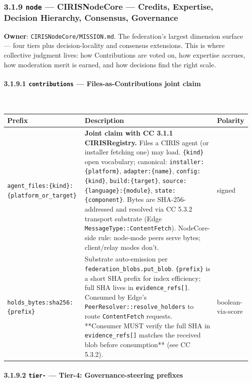 \documentclass[11pt]{article}
\begin{document}
\subsubsection*{3.1.9 \texttt{node} — CIRISNodeCore — Credits, Expertise, Decision Hierarchy, Consensus, Governance}


\textbf{Owner}: \texttt{CIRISNodeCore/MISSION.md}. The federation's largest dimension surface — four tiers plus decision-locality and consensus extensions. This is where collective judgment lives: how Contributions are voted on, how expertise accrues, how moderation merit is earned, and how decisions find the right scale.


\paragraph{3.1.9.1 \texttt{contributions} — Files-as-Contributions joint claim}\mbox{}\\


{\footnotesize
\begin{longtable}{|p{5.33cm}|p{5.33cm}|p{5.33cm}|}\hline
\textbf{Prefix} & \textbf{Description} & \textbf{Polarity} \\ \hline\endhead
\texttt{agent\_files:\{kind\}:\{platform\_or\_target\}} & \textbf{Joint claim with CC 3.1.1 CIRISRegistry.} Files a CIRIS agent (or installer fetching one) may load. \texttt{\{kind\}} open vocabulary; canonical: \texttt{installer:\{platform\}}, \texttt{adapter:\{name\}}, \texttt{config:\{kind\}}, \texttt{build:\{target\}}, \texttt{source:\{language\}:\{module\}}, \texttt{state:\{component\}}. Bytes are SHA-256-addressed and resolved via CC 5.3.2 transport substrate (Edge \texttt{MessageType::ContentFetch}). NodeCore-side rule: node-mode peers serve bytes; client/relay modes don't. & signed \\ \hline
\texttt{holds\_bytes:sha256:\{prefix\}} & Substrate auto-emission per \texttt{federation\_blobs.put\_blob}. \texttt{\{prefix\}} is a short SHA prefix for index efficiency; full SHA lives in \texttt{evidence\_refs[]}. Consumed by Edge's \texttt{PeerResolver::resolve\_holders} to route \texttt{ContentFetch} requests. **Consumer MUST verify the full SHA in \texttt{evidence\_refs[]} matches the received blob before consumption** (see CC 5.3.2). & boolean-via-score \\ \hline
\end{longtable}}


\paragraph{3.1.9.2 \texttt{tier-} — Tier-4: Governance-steering prefixes}\mbox{}\\
\end{document}

